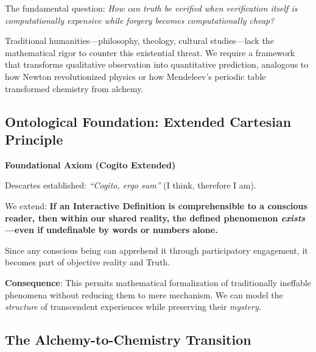 \documentclass[11pt,a4paper]{article}
\theoremstyle{definition}
\theoremstyle{remark}
\begin{document}
\begin{small}
The fundamental question: \textit{How can truth be verified when verification itself is computationally expensive while forgery becomes computationally cheap?}

Traditional humanities—philosophy, theology, cultural studies—lack the mathematical rigor to counter this existential threat. We require a framework that transforms qualitative observation into quantitative prediction, analogous to how Newton revolutionized physics or how Mendeleev's periodic table transformed chemistry from alchemy.


\subsection{Ontological Foundation: Extended Cartesian Principle}

\begin{mdframed}[backgroundcolor=green!10,linewidth=2pt,linecolor=green!70!black]
\textbf{Foundational Axiom (Cogito Extended)}

Descartes established: \textit{``Cogito, ergo sum''} (I think, therefore I am).

We extend: \textbf{If an Interactive Definition is comprehensible to a conscious reader, then within our shared reality, the defined phenomenon \textit{exists}—even if undefinable by words or numbers alone.}

Since any conscious being can apprehend it through participatory engagement, it becomes part of objective reality and Truth.

\vspace{0.3em}

\textbf{Consequence}: This permits mathematical formalization of traditionally ineffable phenomena without reducing them to mere mechanism. We can model the \textit{structure} of transcendent experiences while preserving their \textit{mystery}.
\end{mdframed}


\subsection{The Alchemy-to-Chemistry Transition}



\end{small}
\end{document}
